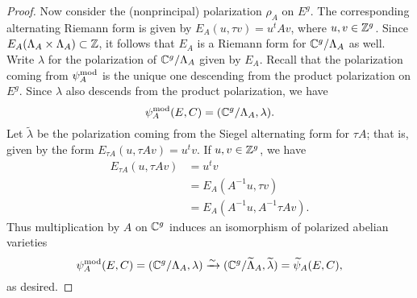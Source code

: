 \documentclass{amsart}
\begin{document}
\begin{proof}
Now consider the (nonprincipal) polarization $\rho_A$ on $E^g$. The corresponding alternating Riemann form is given by $E_A(u,\tau v) = u^tAv$, where $u,v \in \mathbb{Z}^g$. Since $E_A(\Lambda_A \times \Lambda_A) \subset \mathbb{Z}$, it follows that $E_A$ is a Riemann form for $\mathbb{C}^g/\Lambda_A$ as well. Write $\lambda$ for the polarization of $\mathbb{C}^g/\Lambda_A$ given by $E_A$. Recall that the polarization coming from $\psi_{A}^\mathrm{mod}$ is the unique one descending from the product polarization on $E^g$. Since $\lambda$ also descends from the product polarization, we have
\[
  \psi_{A}^\mathrm{mod}(E,C) = (\mathbb{C}^g/\Lambda_A, \lambda).
\]
Let $\tilde{\lambda}$ be the polarization coming from the Siegel alternating form for $\tau A$; that is, given by the form $E_{\tau A}(u, \tau A v) = u^tv$. If $u, v \in \mathbb{Z}^g$, we have
\begin{align*}
  E_{\tau A} (u, \tau A v) &= u^tv \\
                          &= E_A(A^{-1}u, \tau v) \\
                          &= E_{A}(A^{-1}u, A^{-1}\tau Av).
\end{align*}
Thus multiplication by $A$ on $\mathbb{C}^g$ induces an isomorphism of polarized abelian varieties
\[
  \psi_{A}^\mathrm{mod}(E,C) = (\mathbb{C}^g/\Lambda_A, \lambda) \xrightarrow{\sim} (\mathbb{C}^g/\widetilde{\Lambda}_A, \widetilde{\lambda}) = \widetilde{\psi}_{A}(E,C),
\]
as desired.



\end{proof}
\end{document}
